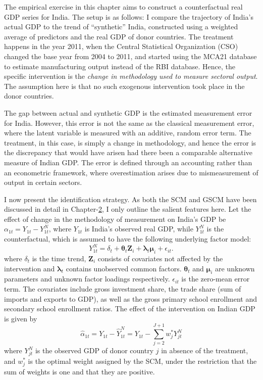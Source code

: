 \documentclass[12pt,nobind, a4paper]{reedthesis}
\begin{document}
 The empirical exercise in this chapter aims to construct a counterfactual real GDP series for India. The setup is as follows: I compare the trajectory of India's actual GDP to the trend of ``synthetic'' India, constructed using a weighted average of predictors and the real GDP of donor countries. The treatment happens in the year 2011, when the Central Statistical Organization (CSO) changed the base year from 2004 to 2011, and started using the MCA21 database to estimate manufacturing output instead of the RBI database. Hence, the specific intervention is the \emph{change in methodology used to measure sectoral output}. The assumption here is that no such exogenous intervention took place in the donor countries.
 \linebreak

 The gap between actual and synthetic GDP is the estimated measurement error for India. However, this error is not the same as the classical measurement error, where the latent variable is measured with an additive, random error term. The treatment, in this case, is simply a change in methodology, and hence the error is the discrepancy that would have arisen had there been a comparable alternative measure of Indian GDP. The error is defined through an accounting rather than an econometric framework, where overestimation arises due to mismeasurement of output in certain sectors.
 \linebreak

 I now present the identification strategy. As both the SCM and GSCM have been discussed in detail in Chapter-\protect\hyperlink{ch2}{2}, I only outline the salient features here. Let the effect of change in the methodology of measurement on India's GDP be \(\alpha_{1t}= Y_{1t}-Y^{N}_{1t}\), where \(Y_{1t}\) is India's observed real GDP, while \(Y^{N}_{1t}\) is the counterfactual, which is assumed to have the following underlying factor model:
 \begin{equation}
 Y^{N}_{1t}= \delta_{t}+\boldsymbol{\theta}_{t}\mathbf{Z}_{i}+\boldsymbol{\lambda}_{t} \boldsymbol{\mu}_{i}+ \epsilon_{it}.
 \label{eq:eq99}
 \end{equation}
 where \(\delta_{t}\) is the time trend, \(\mathbf{Z}_{i}\) consists of covariates not affected by the intervention and \(\boldsymbol{\lambda}_{t}\) contains unobserved common factors. \(\boldsymbol{\theta}_{t}\) and \(\boldsymbol{\mu}_{i}\) are unknown parameters and unknown factor loadings respectively. \(\epsilon_{it}\) is the zero-mean error term. The covariates include gross investment share, the trade share (sum of imports and exports to GDP), as well as the gross primary school enrollment and secondary school enrollment ratios. The effect of the intervention on Indian GDP is given by
 \begin{equation}
 \hat{\alpha}_{1t}={Y_{1t}}-\hat{Y}^{N}_{1t}={Y_{1t}}-\sum_{j=2}^{J+1}w^{*}_{j}Y^{N}_{jt}
 \label{eq:eq88}
 \end{equation}
 where \(Y^{N}_{jt}\) is the observed GDP of donor country \(j\) in absence of the treatment, and \(w^{*}_{j}\) is the optimal weight assigned by the SCM, under the restriction that the sum of weights is one and that they are positive.
 \linebreak
\end{document}
